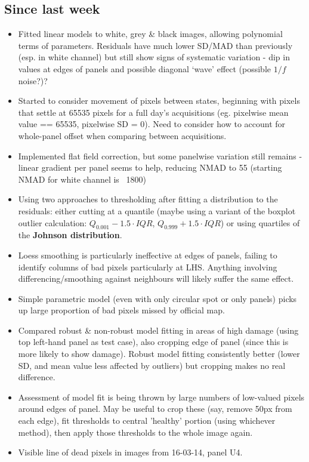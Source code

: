 \documentclass[10pt,fleqn]{article}
\begin{document}
\subsection*{Since last week}

\begin{itemize}

\item Fitted linear models to white, grey \& black images, allowing polynomial terms of parameters. Residuals have much lower SD/MAD than previously (esp. in white channel) but still show signs of systematic variation - dip in values at edges of panels and possible diagonal `wave' effect (possible $1/f$ noise?)?
 
\item Started to consider movement of pixels between states, beginning with pixels that settle at 65535 pixels for a full day's acquisitions (eg. pixelwise mean value == 65535, pixelwise SD = 0). Need to consider how to account for whole-panel offset when comparing between acquisitions.

\item Implemented flat field correction, but some panelwise variation still remains - linear gradient per panel seems to help, reducing NMAD to 55 (starting NMAD for white channel is ~1800)

\item Using two approaches to thresholding after fitting a distribution to the residuals: either cutting at a quantile (maybe using a variant of the boxplot outlier calculation: $Q_{0.001} - 1.5 \cdot IQR$, $Q_{0.999} + 1.5 \cdot IQR$) or using quartiles of the \textbf{Johnson distribution}.

\item Loess smoothing is particularly ineffective at edges of panels, failing to identify columns of bad pixels particularly at LHS. Anything involving differencing/smoothing against neighbours will likely suffer the same effect.

\item Simple parametric model (even with only circular spot or only panels) picks up large proportion of bad pixels missed by official map.

\item Compared robust \& non-robust model fitting in areas of high damage (using top left-hand panel as test case), also cropping edge of panel (since this is more likely to show damage). Robust model fitting consistently better (lower SD, and mean value less affected by outliers) but cropping makes no real difference.

\item Assessment of model fit is being thrown by large numbers of low-valued pixels around edges of panel. May be useful to crop these (say, remove 50px from each edge), fit thresholds to central 'healthy' portion (using whichever method), then apply those thresholds to the whole image again.

\item Visible line of dead pixels in images from 16-03-14, panel U4.
\end{itemize}
\end{document}
